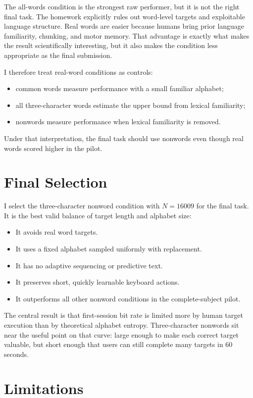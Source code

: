\documentclass[11pt]{article}
\begin{document}
The all-words condition is the strongest raw performer, but it is not the right final task. The homework explicitly rules out word-level targets and exploitable language structure. Real words are easier because humans bring prior language familiarity, chunking, and motor memory. That advantage is exactly what makes the result scientifically interesting, but it also makes the condition less appropriate as the final submission.

I therefore treat real-word conditions as controls:
\begin{itemize}
  \item common words measure performance with a small familiar alphabet;
  \item all three-character words estimate the upper bound from lexical familiarity;
  \item nonwords measure performance when lexical familiarity is removed.
\end{itemize}

Under that interpretation, the final task should use nonwords even though real words scored higher in the pilot.

\section{Final Selection}

I select the three-character nonword condition with \(N=16009\) for the final task. It is the best valid balance of target length and alphabet size:
\begin{itemize}
  \item It avoids real word targets.
  \item It uses a fixed alphabet sampled uniformly with replacement.
  \item It has no adaptive sequencing or predictive text.
  \item It preserves short, quickly learnable keyboard actions.
  \item It outperforms all other nonword conditions in the complete-subject pilot.
\end{itemize}

The central result is that first-session bit rate is limited more by human target execution than by theoretical alphabet entropy. Three-character nonwords sit near the useful point on that curve: large enough to make each correct target valuable, but short enough that users can still complete many targets in 60 seconds.

\section{Limitations}
\end{document}
